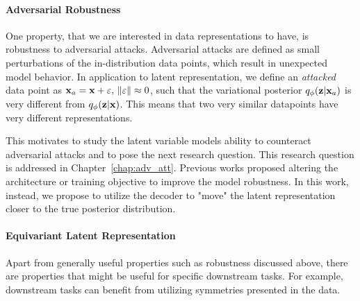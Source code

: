 \paragraph{Adversarial Robustness}
One property, that we are interested in data representations to have, is robustness to adversarial attacks. 
Adversarial attacks are defined as small perturbations of the in-distribution data points, which result in unexpected model behavior. 
In application to latent representation, we define an \textit{attacked} data point as ${\mathbf{x}}_a = {\mathbf{x}} + \varepsilon,\,\|\varepsilon\|\approx 0$, such that the variational posterior $q_{\phi}({\mathbf{z}}|{\mathbf{x}}_a)$ is very different from $q_{\phi}({\mathbf{z}}|{\mathbf{x}})$. 
This means that two very similar datapoints have very different representations.

This motivates to study the latent variable models ability to counteract adversarial attacks and to pose the next research question.
This research question is addressed in Chapter~\ref{chap:adv_att}. Previous works proposed altering the architecture or training objective to improve the model robustness. In this work, instead, we propose to utilize the decoder to "move" the latent representation closer to the true posterior distribution. 

\paragraph{Equivariant Latent Representation}
Apart from generally useful properties such as robustness discussed above, there are properties that might be useful for specific downstream tasks. 
For example, downstream tasks can benefit from utilizing symmetries presented in the data. 

